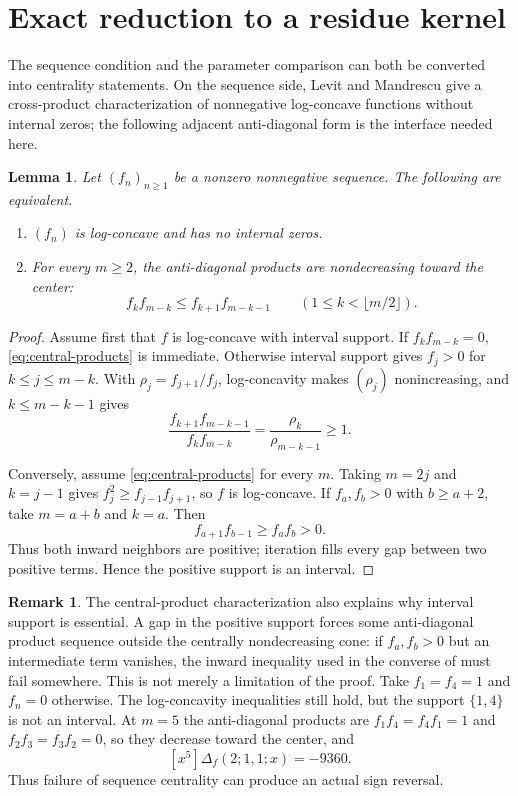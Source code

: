 \documentclass[11pt,a4paper]{amsart}
\numberwithin{equation}{section}
\theoremstyle{plain}
\newtheorem{lemma}[theorem]{Lemma}
\theoremstyle{definition}
\newtheorem{remark}[theorem]{Remark}
\newcommand{\Tur}{\Delta}
\begin{document}
\section{Exact reduction to a residue kernel}\label{sec:reduction}

The sequence condition and the parameter comparison can both be converted into
centrality statements.  On the sequence side, Levit and Mandrescu
\cite[Lem.~2.2(ii)]{LevitMandrescu2006LogConcavity} give
a cross-product characterization of nonnegative log-concave functions without
internal zeros; the following adjacent anti-diagonal form is the interface needed
here.

\begin{lemma}\label{lem:central-products}
Let \((f_n)_{n\ge1}\) be a nonzero nonnegative sequence.  The following are
equivalent.
\begin{enumerate}
\item \((f_n)\) is log-concave and has no internal zeros.
\item For every \(m\ge2\), the anti-diagonal products are nondecreasing toward
the center:
\begin{equation}\label{eq:central-products}
 f_kf_{m-k}\le f_{k+1}f_{m-k-1}
 \qquad(1\le k<\lfloor m/2\rfloor).
\end{equation}
\end{enumerate}
\end{lemma}

\begin{proof}
Assume first that \(f\) is log-concave with interval support.  If
\(f_kf_{m-k}=0\), \eqref{eq:central-products} is immediate.  Otherwise interval
support gives \(f_j>0\) for \(k\le j\le m-k\).  With
\(\rho_j=f_{j+1}/f_j\), log-concavity makes \((\rho_j)\) nonincreasing, and
\(k\le m-k-1\) gives
\[
 \frac{f_{k+1}f_{m-k-1}}{f_kf_{m-k}}
 =\frac{\rho_k}{\rho_{m-k-1}}\ge1.
\]

Conversely, assume \eqref{eq:central-products} for every \(m\).  Taking
\(m=2j\) and \(k=j-1\) gives \(f_j^2\ge f_{j-1}f_{j+1}\),
so \(f\) is log-concave.  If \(f_a,f_b>0\) with \(b\ge a+2\), take
\(m=a+b\) and \(k=a\).  Then
\[
 f_{a+1}f_{b-1}\ge f_af_b>0.
\]
Thus both inward neighbors are positive; iteration fills every gap between two
positive terms.  Hence the positive support is an interval.
\end{proof}

\begin{remark}\label{rem:internal-zeros}
The central-product characterization also explains why interval support is
essential.  A gap in the positive support forces some anti-diagonal product
sequence outside the centrally nondecreasing cone: if \(f_a,f_b>0\) but an
intermediate term vanishes, the inward inequality used in the converse of
 must fail somewhere.  This is not merely a
limitation of the proof.  Take \(f_1=f_4=1\) and \(f_n=0\) otherwise.  The
log-concavity inequalities still hold, but the support \(\{1,4\}\) is not an
interval.  At \(m=5\) the anti-diagonal products are \(f_1f_4=f_4f_1=1\) and
\(f_2f_3=f_3f_2=0\), so they decrease toward the center, and
\[
 [x^5]\Tur_f(2;1,1;x)=-9360.
\]
Thus failure of sequence centrality can produce an actual sign reversal.
\end{remark}
\end{document}
